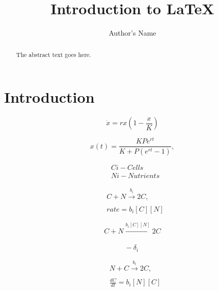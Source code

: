\documentclass{article}
\begin{document}
\title{Introduction to \LaTeX{}}
\author{Author's Name}

\maketitle

\begin{abstract}
The abstract text goes here.
\end{abstract}

\section{Introduction}


\begin{equation}
\label{eq:1}
\dot{x} = rx\left(1 - \frac{x}{K}\right)
\end{equation}

\begin{equation}
\label{eq:2}
x(t) = \frac{KPe^{rt}}{K + P(e^{rt}-1)},
\end{equation}

\begin{subequations}
	\begin{align}
	&C{i} - Cells\\
	&N{i} - Nutrients
	\end{align}
\end{subequations}

\begin{subequations}
	\label{eq:9}
	\begin{align}
	&C + N \xrightarrow[]{b_{i}} 2C,\\
	&rate = b_{i}[C][N]
	\end{align}
\end{subequations}

\begin{equation}
	C + N \xrightarrow[]{b_{i}[C][N]} 2C
\end{equation}

\begin{equation}
    -~\delta_{i}
\end{equation}

\begin{subequations}
	\label{eq:9}
	\begin{align}
	&N + C \xrightarrow[]{b_{i}} 2C,\\
	&\frac{dC}{dt} = b_{i}[N][C]
	\end{align}
\end{subequations}
\end{document}
